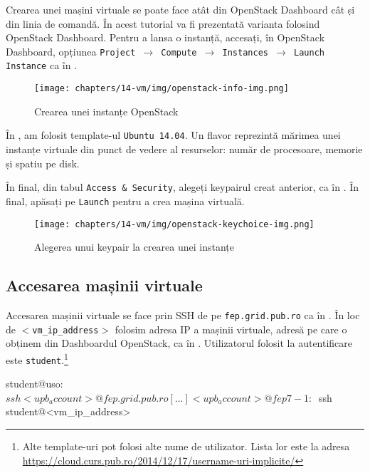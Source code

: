 Crearea unei mașini virtuale se poate face atât din OpenStack Dashboard cât și
din linia de comandă. În acest tutorial va fi prezentată varianta folosind
OpenStack Dashboard. Pentru a lansa o instanță, accesați, în OpenStack Dashboard, opțiunea
\texttt{Project $\rightarrow$ Compute $\rightarrow$ Instances $\rightarrow$ Launch Instance} ca în .

\begin{figure}[!htbp]
  \centering
  \texttt{[image: chapters/14-vm/img/openstack-info-img.png]}
  \caption{Crearea unei instanțe OpenStack}
  \label{fig:vm:openstack-info-img}
\end{figure}

În , am folosit template-ul \texttt{Ubuntu 14.04}. Un flavor reprezintă
mărimea unei instanțe virtuale din punct de vedere al resurselor: număr de
procesoare, memorie și spatiu pe disk.

În final, din tabul \texttt{Access \& Security}, alegeți keypairul creat anterior, ca în . În final, apăsați pe \texttt{Launch} pentru a crea mașina virtuală.

\begin{figure}[!htbp]
  \centering
  \texttt{[image: chapters/14-vm/img/openstack-keychoice-img.png]}
  \caption{Alegerea unui keypair la crearea unei instanțe}
  \label{fig:vm:openstack-keychoice}
\end{figure}

\subsection{Accesarea mașinii virtuale}
\label{sec:vm:upb-openstack:vm-access}

Accesarea mașinii virtuale se face prin SSH de pe \texttt{fep.grid.pub.ro} ca în .
În loc de \texttt{$<$vm\_ip\_address$>$} folosim adresa IP a mașinii virtuale, adresă pe care o obținem din Dashboardul OpenStack, ca în .  Utilizatorul folosit la autentificare este \texttt{student}.\footnote{Alte template-uri pot folosi alte nume de utilizator. Lista lor este la adresa \url{https://cloud.curs.pub.ro/2014/12/17/username-uri-implicite/}}

\begin{screen}[caption={Accesarea mașinii virtuale prin intermediul fep.grid.pub.ro},label={lst:vm:access-vm}]
student@uso:~$ ssh <upb_account>@fep.grid.pub.ro
[...]
<upb_account>@fep7-1:~$ ssh student@<vm_ip_address>
\end{screen}


